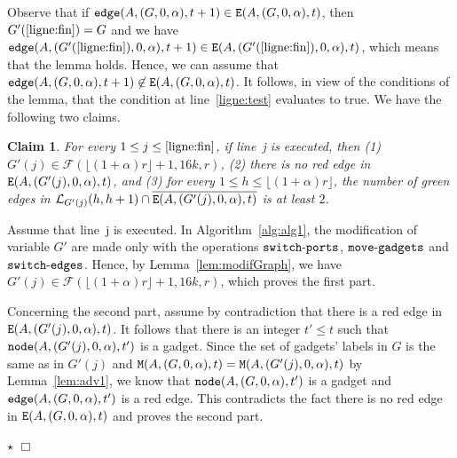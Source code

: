 \documentclass[11pt]{article}
\newtheorem{claim}{Claim}[section]
\newcommand{\qed}{\hfill $\Box$ \bigbreak}
\newenvironment{proof}{\noindent {\bf Proof.}}{\qed}
\newenvironment{proofclaim}{\noindent{\bf Proof of the claim.}}{\hfill$\star$}
\begin{document}
{\begin{proof}
Observe that if ${\tt edge}(A,(G,0,\alpha),t+1)\in {\tt E}(A,(G,0,\alpha),t)$, then $G'(\ref{ligne:fin})=G$ and we have 
${\tt edge}(A,(G'(\ref{ligne:fin}),0,\alpha),t+1)\in{\tt E}(A,(G'(\ref{ligne:fin}),0,\alpha),t)$, which means that the lemma holds. Hence, we can assume that ${\tt edge}(A,(G,0,\alpha),t+1)\not\in {\tt E}(A,(G,0,\alpha),t)$. It follows, in view of the conditions of the lemma,  that the condition at line~\ref{ligne:test} evaluates to true. We have the following two claims.

\begin{claim}\label{claim:triv}
For every $1\leq j \leq \ref{ligne:fin}$, if line~j is executed, then (1) $G'(j)\in\mathcal{F}(\lfloor(1+\alpha)r\rfloor+1,16k,r)$, (2) there is no red edge in ${\tt E}(A,(G'(j),0,\alpha),t)$, and (3) for every $1\leq h\leq\lfloor(1+\alpha)r\rfloor$, the number of green edges in $\mathcal{L}_{G'(j)}(h,h+1)\cap\overline{{\tt E}(A,(G'(j),0,\alpha),t)}$ is at least $2$.
\end{claim}

\begin{proofclaim}
Assume that line~j is executed. In Algorithm~\ref{alg:alg1}, the modification of variable $G'$ are made only with the operations ${\tt switch\mbox{-}ports}$, ${\tt move\mbox{-}gadgets}$ and ${\tt switch\mbox{-}edges}$. Hence, by Lemma~\ref{lem:modifGraph}, we have $G'(j)\in\mathcal{F}(\lfloor(1+\alpha)r\rfloor+1,16k,r)$, which proves the first part. 

Concerning the second part, assume by contradiction that there is a red edge in  ${\tt E}(A,(G'(j),0,\alpha),t)$. It follows that there is an integer $t'\leq t$ such that  ${\tt node}(A,(G'(j),0,\alpha),t')$ is a gadget. Since the set of gadgets' labels in $G$ is the same as in $G'(j)$ and ${\tt M}(A,(G,0,\alpha),t)={\tt M}(A,(G'(j),0,\alpha),t)$ by Lemma~\ref{lem:adv1}, we know that ${\tt node}(A,(G,0,\alpha),t')$ is a gadget and ${\tt edge}(A,(G,0,\alpha),t')$ is a red edge. This contradicts the fact there is no red edge in ${\tt E}(A,(G,0,\alpha),t)$ and proves the second part.


\end{proofclaim}
\end{proof}}
\end{document}
